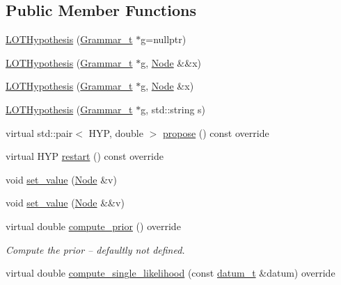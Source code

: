 \subsection*{Public Member Functions}
\begin{DoxyCompactItemize}
\item 
\hyperlink{class_l_o_t_hypothesis_a2c1ff366f7a839d9acae415823ceb112}{L\+O\+T\+Hypothesis} (\hyperlink{class_l_o_t_hypothesis_a8006204013d471860e54c49d19edbace}{Grammar\+\_\+t} $\ast$g=nullptr)
\item 
\hyperlink{class_l_o_t_hypothesis_aa14b68e8efcb570186fe289bc4a791d5}{L\+O\+T\+Hypothesis} (\hyperlink{class_l_o_t_hypothesis_a8006204013d471860e54c49d19edbace}{Grammar\+\_\+t} $\ast$g, \hyperlink{class_node}{Node} \&\&x)
\item 
\hyperlink{class_l_o_t_hypothesis_a877ff1340bdf69fa2d9ed290c70f1cfb}{L\+O\+T\+Hypothesis} (\hyperlink{class_l_o_t_hypothesis_a8006204013d471860e54c49d19edbace}{Grammar\+\_\+t} $\ast$g, \hyperlink{class_node}{Node} \&x)
\item 
\hyperlink{class_l_o_t_hypothesis_a9361067f4f283bc21f77eee178965b39}{L\+O\+T\+Hypothesis} (\hyperlink{class_l_o_t_hypothesis_a8006204013d471860e54c49d19edbace}{Grammar\+\_\+t} $\ast$g, std\+::string s)
\item 
virtual std\+::pair$<$ H\+YP, double $>$ \hyperlink{class_l_o_t_hypothesis_a9a03abc8a6d96995c0f13524f8500747}{propose} () const override
\item 
virtual H\+YP \hyperlink{class_l_o_t_hypothesis_a0791b7ba0105870a2094877445570b61}{restart} () const override
\item 
void \hyperlink{class_l_o_t_hypothesis_aac23de5143f24323a05ed32774387ff7}{set\+\_\+value} (\hyperlink{class_node}{Node} \&v)
\item 
void \hyperlink{class_l_o_t_hypothesis_a51a0d09f0f15a185d2b9a7efce48fc98}{set\+\_\+value} (\hyperlink{class_node}{Node} \&\&v)
\item 
virtual double \hyperlink{class_l_o_t_hypothesis_af215c4833e81984364703b2e4cb78dc7}{compute\+\_\+prior} () override
\begin{DoxyCompactList}\small\item\em Compute the prior -- defaultly not defined. \end{DoxyCompactList}\item 
virtual double \hyperlink{class_l_o_t_hypothesis_a0ff11e5e328fcfa819a8dd9b5d57bd65}{compute\+\_\+single\+\_\+likelihood} (const \hyperlink{class_l_o_t_hypothesis_ae36b1f113f45ee5ac82660028672739b}{datum\+\_\+t} \&datum) override

\end{DoxyCompactItemize}
